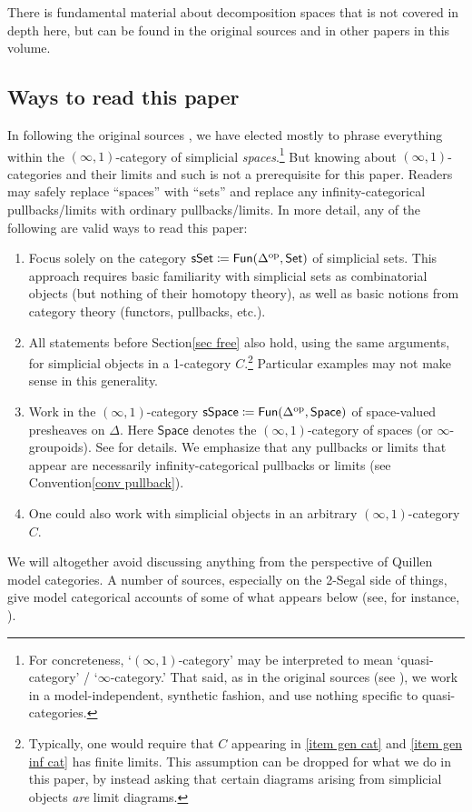 \documentclass{conm-p-l}
\theoremstyle{definition}
\theoremstyle{remark}
\newcommand{\set}{\mathsf{Set}}
\newcommand{\spaces}{\mathsf{Space}}
\newcommand{\sset}{\mathsf{sSet}}
\newcommand{\sspace}{\mathsf{sSpace}}
\newcommand{\fun}{\mathsf{Fun}}
\newcommand{\op}{\textup{op}}
\begin{document}
There is fundamental material about decomposition spaces that is not covered in depth here, but can be found in the original sources and in other papers in this volume.

\subsection{Ways to read this paper}\label{sec ways to read}
In following the original sources \cite{GKT1,GKT2,GKT3}, we have elected mostly to phrase everything within the $(\infty,1)$-category of simplicial \emph{spaces}.\footnote{For concreteness, `$(\infty,1)$-category' may be interpreted to mean `quasi-category' / `$\infty$-category.' 
That said, as in the original sources (see \cite[1.3]{GKT1}), we work in a model-independent, synthetic fashion, and use nothing specific to quasi-categories.}
But knowing about $(\infty,1)$-categories and their limits and such is not a prerequisite for this paper.
Readers may safely replace ``spaces'' with ``sets'' and replace any infinity-categorical pullbacks/limits with ordinary pullbacks/limits.
In more detail, any of the following are valid ways to read this paper:
\begin{enumerate}[left=0pt]
\item Focus solely on the category $\sset \coloneqq \fun(\Delta^\op, \set)$ of simplicial sets. 
This approach requires basic familiarity with simplicial sets as combinatorial objects (but nothing of their homotopy theory), as well as basic notions from category theory (functors, pullbacks, etc.).
\label{item sset}
\item All statements before Section\nobreakspace \ref {sec free} also hold, using the same arguments, for simplicial objects in a 1-category $C$.\footnote{Typically, one would require that $C$ appearing in \eqref{item gen cat} and \eqref{item gen inf cat} has finite limits.
This assumption can be dropped for what we do in this paper, by instead asking that certain diagrams arising from simplicial objects \emph{are} limit diagrams.}
Particular examples may not make sense in this generality.
\label{item gen cat}
\item Work in the $(\infty,1)$-category $\sspace \coloneqq \fun(\Delta^\op, \spaces)$ of space-valued presheaves on $\Delta$.
Here $\spaces$ denotes the $(\infty,1)$-category of spaces (or $\infty$-groupoids).
See \cite{GKT1} for details.
We emphasize that any pullbacks or limits that appear are necessarily infinity-categorical pullbacks or limits (see Convention\nobreakspace \ref {conv pullback}).
\item 
One could also work with simplicial objects in an arbitrary $(\infty,1)$-category $C$.
\label{item gen inf cat}
\end{enumerate}
We will altogether avoid discussing anything from the perspective of Quillen model categories.
A number of sources, especially on the 2-Segal side of things, give model categorical accounts of some of what appears below (see, for instance, \cite{DyckerhoffKapranov:HSS,Feller:Q2SS,BOORS:ESC}).
\end{document}
